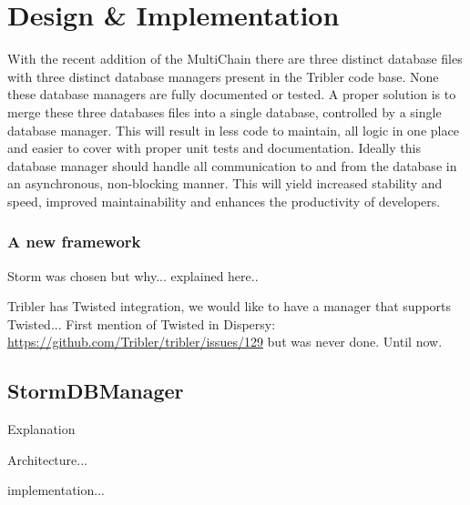 \chapter{Design \& Implementation}

With the recent addition of the MultiChain there are three distinct database files with three distinct database managers present in the Tribler code base.
None these database managers are fully documented or tested.
A proper solution is to merge these three databases files into a single database, controlled by a single database manager.
This will result in less code to maintain, all logic in one place and easier to cover with proper unit tests and documentation.
Ideally this database manager should handle all communication to and from the database in an asynchronous, non-blocking manner.
This will yield increased stability and speed, improved maintainability and enhances the productivity of developers.

\subsection{A new framework}
Storm was chosen but why... explained here..

Tribler has Twisted integration, we would like to have a manager that supports Twisted...
First mention of Twisted in Dispersy: \url{https://github.com/Tribler/tribler/issues/129} but was never done.
Until now.


\section{StormDBManager}

Explanation

Architecture...

implementation...
